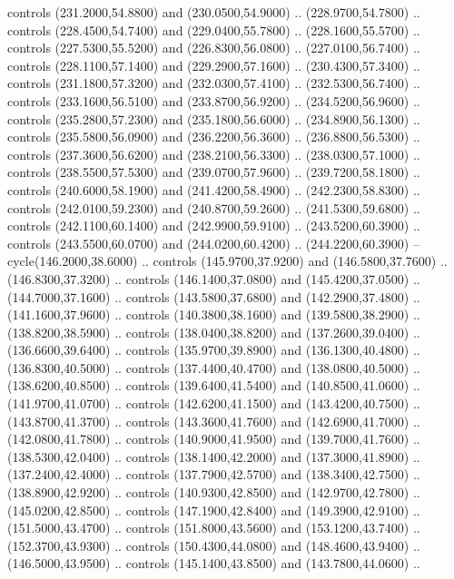 {\begin{scope}[y=0.80pt, x=0.80pt, yscale=-1, xscale=1, inner sep=0pt, outer sep=0pt, #1]
      controls (231.2000,54.8800) and (230.0500,54.9000) .. (228.9700,54.7800) ..
      controls (228.4500,54.7400) and (229.0400,55.7800) .. (228.1600,55.5700) ..
      controls (227.5300,55.5200) and (226.8300,56.0800) .. (227.0100,56.7400) ..
      controls (228.1100,57.1400) and (229.2900,57.1600) .. (230.4300,57.3400) ..
      controls (231.1800,57.3200) and (232.0300,57.4100) .. (232.5300,56.7400) ..
      controls (233.1600,56.5100) and (233.8700,56.9200) .. (234.5200,56.9600) ..
      controls (235.2800,57.2300) and (235.1800,56.6000) .. (234.8900,56.1300) ..
      controls (235.5800,56.0900) and (236.2200,56.3600) .. (236.8800,56.5300) ..
      controls (237.3600,56.6200) and (238.2100,56.3300) .. (238.0300,57.1000) ..
      controls (238.5500,57.5300) and (239.0700,57.9600) .. (239.7200,58.1800) ..
      controls (240.6000,58.1900) and (241.4200,58.4900) .. (242.2300,58.8300) ..
      controls (242.0100,59.2300) and (240.8700,59.2600) .. (241.5300,59.6800) ..
      controls (242.1100,60.1400) and (242.9900,59.9100) .. (243.5200,60.3900) ..
      controls (243.5500,60.0700) and (244.0200,60.4200) .. (244.2200,60.3900) --
      cycle(146.2000,38.6000) .. controls (145.9700,37.9200) and (146.5800,37.7600)
      .. (146.8300,37.3200) .. controls (146.1400,37.0800) and (145.4200,37.0500) ..
      (144.7000,37.1600) .. controls (143.5800,37.6800) and (142.2900,37.4800) ..
      (141.1600,37.9600) .. controls (140.3800,38.1600) and (139.5800,38.2900) ..
      (138.8200,38.5900) .. controls (138.0400,38.8200) and (137.2600,39.0400) ..
      (136.6600,39.6400) .. controls (135.9700,39.8900) and (136.1300,40.4800) ..
      (136.8300,40.5000) .. controls (137.4400,40.4700) and (138.0800,40.5000) ..
      (138.6200,40.8500) .. controls (139.6400,41.5400) and (140.8500,41.0600) ..
      (141.9700,41.0700) .. controls (142.6200,41.1500) and (143.4200,40.7500) ..
      (143.8700,41.3700) .. controls (143.3600,41.7600) and (142.6900,41.7000) ..
      (142.0800,41.7800) .. controls (140.9000,41.9500) and (139.7000,41.7600) ..
      (138.5300,42.0400) .. controls (138.1400,42.2000) and (137.3000,41.8900) ..
      (137.2400,42.4000) .. controls (137.7900,42.5700) and (138.3400,42.7500) ..
      (138.8900,42.9200) .. controls (140.9300,42.8500) and (142.9700,42.7800) ..
      (145.0200,42.8500) .. controls (147.1900,42.8400) and (149.3900,42.9100) ..
      (151.5000,43.4700) .. controls (151.8000,43.5600) and (153.1200,43.7400) ..
      (152.3700,43.9300) .. controls (150.4300,44.0800) and (148.4600,43.9400) ..
      (146.5000,43.9500) .. controls (145.1400,43.8500) and (143.7800,44.0600) ..

\end{scope}}
